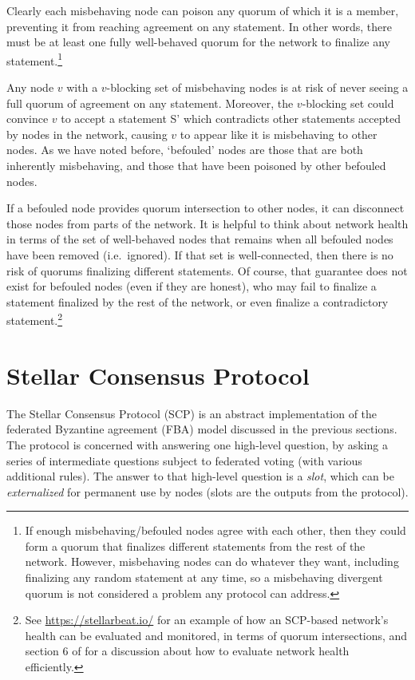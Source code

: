 Clearly each misbehaving node can poison any quorum of which it is a member, preventing it from reaching agreement on any statement. In other words, there must be at least one fully well-behaved quorum for the network to finalize any statement.\footnote{If enough misbehaving/befouled nodes agree with each other, then they could form a quorum that finalizes different statements from the rest of the network. However, misbehaving nodes can do whatever they want, including finalizing any random statement at any time, so a misbehaving divergent quorum is not considered a problem any protocol can address.}

Any node $v$ with a $v$-blocking set of misbehaving nodes is at risk of never seeing a full quorum of agreement on any statement. Moreover, the $v$-blocking set could convince $v$ to accept a statement S' which contradicts other statements accepted by nodes in the network, causing $v$ to appear like it is misbehaving to other nodes. As we have noted before, `befouled' nodes are those that are both inherently misbehaving, and those that have been poisoned by other befouled nodes.

If a befouled node provides quorum intersection to other nodes, it can disconnect those nodes from parts of the network. It is helpful to think about network health in terms of the set of well-behaved nodes that remains when all befouled nodes have been removed (i.e.\ ignored). If that set is well-connected, then there is no risk of quorums finalizing different statements. Of course, that guarantee does not exist for befouled nodes (even if they are honest), who may fail to finalize a statement finalized by the rest of the network, or even finalize a contradictory statement.\footnote{See \url{https://stellarbeat.io/} for an example of how an SCP-based network's health can be evaluated and monitored, in terms of quorum intersections, and section 6 of \cite{fast-secure-global-payments-stellar} for a discussion about how to evaluate network health efficiently.}



\section{Stellar Consensus Protocol}
\label{sec:consensus-stellar-consensus-protocol}

The Stellar Consensus Protocol (SCP) is an abstract implementation of the federated Byzantine agreement (FBA) model discussed in the previous sections. The protocol is concerned with answering one high-level question, by asking a series of intermediate questions subject to federated voting (with various additional rules). The answer to that high-level question is a {\em slot}, which can be {\em externalized} for permanent use by nodes (slots are the outputs from the protocol).

